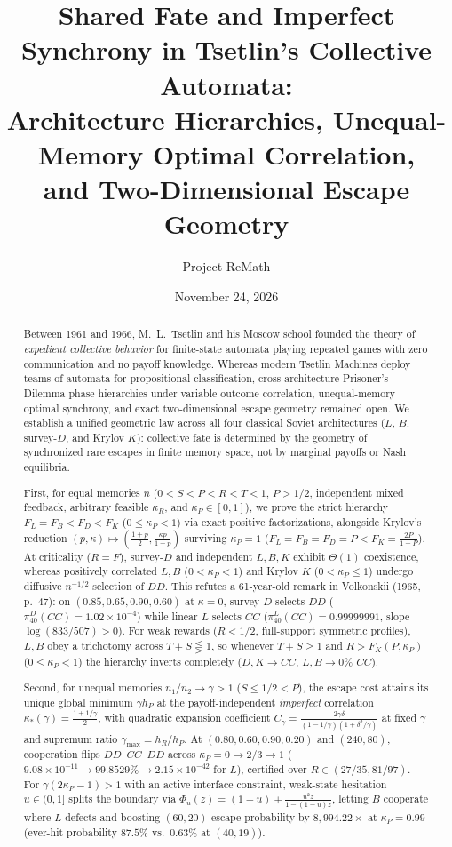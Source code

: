 \documentclass[11pt,reqno]{amsart}
\title[Shared Fate and Imperfect Synchrony in Tsetlin's Collective Automata]{Shared Fate and Imperfect Synchrony in Tsetlin's Collective Automata:\\
Architecture Hierarchies, Unequal-Memory Optimal Correlation,\\
and Two-Dimensional Escape Geometry}
\author{Project ReMath}
\date{November 24, 2026}
\theoremstyle{definition}
\theoremstyle{remark}
\begin{document}
\begin{abstract}
Between 1961 and 1966, M.~L.~Tsetlin and his Moscow school founded the theory of \emph{expedient collective behavior} for finite-state automata playing repeated games with zero communication and no payoff knowledge. Whereas modern Tsetlin Machines deploy teams of automata for propositional classification, cross-architecture Prisoner's Dilemma phase hierarchies under variable outcome correlation, unequal-memory optimal synchrony, and exact two-dimensional escape geometry remained open. We establish a unified geometric law across all four classical Soviet architectures ($L$, $B$, survey-$D$, and Krylov $K$): collective fate is determined by the geometry of synchronized rare escapes in finite memory space, not by marginal payoffs or Nash equilibria.

First, for equal memories $n$ ($0<S<P<R<T<1$, $P>1/2$, independent mixed feedback, arbitrary feasible $\kappa_R$, and $\kappa_P\in[0,1]$), we prove the strict hierarchy $F_L=F_B<F_D<F_K$ ($0\le\kappa_P<1$) via exact positive factorizations, alongside Krylov's reduction $(p,\kappa)\mapsto(\frac{1+p}{2},\frac{\kappa p}{1+p})$ surviving $\kappa_P=1$ ($F_L=F_B=F_D=P<F_K=\frac{2P}{1+P}$). At criticality ($R=F$), survey-$D$ and independent $L,B,K$ exhibit $\Theta(1)$ coexistence, whereas positively correlated $L,B$ ($0<\kappa_P<1$) and Krylov $K$ ($0<\kappa_P\le 1$) undergo diffusive $n^{-1/2}$ selection of $DD$. This refutes a 61-year-old remark in Volkonskii (1965, p.~47): on $(0.85,0.65,0.90,0.60)$ at $\kappa=0$, survey-$D$ selects $DD$ ($\pi_{40}^D(CC)=1.02\times 10^{-4}$) while linear $L$ selects $CC$ ($\pi_{40}^L(CC)=0.99999991$, slope $\log(833/507)>0$). For weak rewards ($R<1/2$, full-support symmetric profiles), $L,B$ obey a trichotomy across $T+S\lesseqgtr 1$, so whenever $T+S\ge 1$ and $R>F_K(P,\kappa_P)$ ($0\le\kappa_P<1$) the hierarchy inverts completely ($D,K\to CC$, $L,B\to 0\%$ $CC$).

Second, for unequal memories $n_1/n_2\to\gamma>1$ ($S\le 1/2<P$), the escape cost attains its unique global minimum $\gamma h_P$ at the payoff-independent \emph{imperfect} correlation $\kappa_*(\gamma)=\frac{1+1/\gamma}{2}$, with quadratic expansion coefficient $C_\gamma=\frac{2\gamma\delta}{(1-1/\gamma)(1+\delta^2/\gamma)}$ at fixed $\gamma$ and supremum ratio $\gamma_{\max}=h_R/h_P$. At $(0.80,0.60,0.90,0.20)$ and $(240,80)$, cooperation flips $DD$--$CC$--$DD$ across $\kappa_P=0\to 2/3\to 1$ ($9.08\times 10^{-11}\to 99.8529\%\to 2.15\times 10^{-42}$ for $L$), certified over $R\in(27/35,81/97)$. For $\gamma(2\kappa_P-1)>1$ with an active interface constraint, weak-state hesitation $u\in(0,1]$ splits the boundary via $\Phi_u(z)=(1-u)+\frac{u^2 z}{1-(1-u)z}$, letting $B$ cooperate where $L$ defects and boosting $(60,20)$ escape probability by $8{,}994.22\times$ at $\kappa_P=0.99$ (ever-hit probability $87.5\%$ vs.\ $0.63\%$ at $(40,19)$).


\end{abstract}
\end{document}
